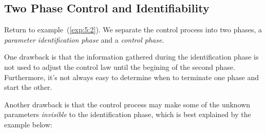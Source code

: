 \subsection{Two Phase Control and Identifiability}
Return to example~(\ref{exp:5:2}).
We separate the control process into two phases, a \emph{parameter identification phase} and a \emph{control phase}.

One drawback is that the information gathered during the identification phase is not used to adjust the control law until the begining of the second phase.
Furthermore, it's not always easy to determine when to terminate one phase and start the other.

Another drawback is that the control process may make some of the unknown parameters \emph{invisible} to the identification phase, which is best explained by the example below:
